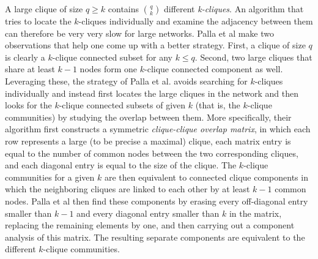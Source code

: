 A large clique of size $q \geq k $ contains $\binom{q}{k}$ different {\em k-cliques}.
An algorithm that tries to locate the $k$-cliques individually and examine the adjacency
between them can therefore be very very slow for large networks. 
Palla et al make two observations that help one come up with a better strategy.
First, a clique of size $q$ is clearly a $k$-clique connected subset for any $k \leq q$. 
Second, two large cliques that share at least $k-1$ nodes form one $k$-clique connected component as well.
Leveraging these, the strategy of Palla et al. avoids searching for $k$-cliques individually
and instead first locates the large cliques in the network and then looks for the $k$-clique connected subsets of given $k$ (that is, the $k$-clique communities) by studying the overlap between them.
More specifically, their algorithm first constructs a symmetric {\em clique-clique overlap matrix}, 
in which each row represents a large (to be precise a maximal) clique, 
each matrix entry is equal to the number of common nodes between the two corresponding cliques, and each diagonal entry is equal to the size of the clique. 
The $k$-clique communities for a given $k$ are then equivalent to connected 
clique components in which the neighboring cliques are linked to each other by at least $k-1$ common nodes. Palla et al then find these components by erasing every off-diagonal entry smaller than $k-1$ and every diagonal entry smaller than $k$ in the matrix, replacing the remaining elements by one, and then carrying out a component analysis of this matrix. The resulting separate components are equivalent to the different $k$-clique communities.
       



